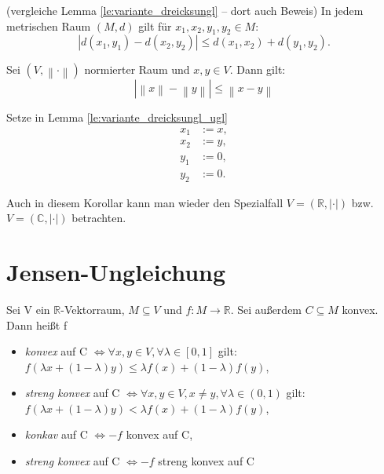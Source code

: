 \documentclass[10pt]{scrbook}
\begin{document}
\begin{Le}
\label{le:variante_dreicksungl_ugl}
(vergleiche Lemma \ref{le:variante_dreicksungl} -- dort auch Beweis)
In jedem metrischen Raum $(M, d)$ gilt für $x_1, x_2, y_1, y_2\in M$:
\begin{equation}
	\left|d(x_1, y_1)-d(x_2, y_2)\right|\leq d(x_1, x_2)+d(y_1, y_2).
\end{equation}
\end{Le}

\begin{Kor}
\label{kor:variante_dreicksungl_ugl}
Sei $(V, \left\|\cdot\right\|)$ normierter Raum und $x, y\in V$. Dann gilt:
\begin{equation}
\left|\left\|x\right\|-\left\|y\right\|\right| \leq \left\|x-y\right\|
\end{equation}
\end{Kor}
\begin{bew}
Setze in Lemma \ref{le:variante_dreicksungl_ugl}
\begin{align*}
x_1 & := x, \\
x_2 & := y, \\
y_1 & := 0, \\
y_2 & := 0.
\end{align*}
\end{bew}

Auch in diesem Korollar kann man wieder den Spezialfall $V=(\mathbb{R}, \left|\cdot\right|)$ bzw. $V=(\mathbb{C}, \left|\cdot\right|)$ betrachten.

\section{Jensen-Ungleichung}

\begin{Def}
\label{def:konvexe_fkt}
Sei V ein $\mathbb{R}$-Vektorraum, $M\subseteq V$ und $f: M\rightarrow \mathbb{R}$. Sei außerdem $C\subseteq M$ konvex. Dann heißt f
\begin{itemize}
\item \emph{konvex} auf C $\Leftrightarrow \forall x, y\in V, \forall \lambda \in\left[0, 1\right]$ gilt: $f(\lambda x+\left(1-\lambda\right) y) \leq \lambda f(x)+\left(1-\lambda\right) f(y)$,
\item \emph{streng konvex} auf C $\Leftrightarrow \forall x, y\in V, x\neq y, \forall \lambda \in\left(0, 1\right)$ gilt: $f(\lambda x+\left(1-\lambda\right) y) < \lambda f(x)+\left(1-\lambda\right) f(y)$,
\item \emph{konkav} auf C $\Leftrightarrow -f$ konvex auf C,
\item \emph{streng konvex} auf C $\Leftrightarrow -f$ streng konvex auf C
\end{itemize}
\end{Def}
\end{document}
